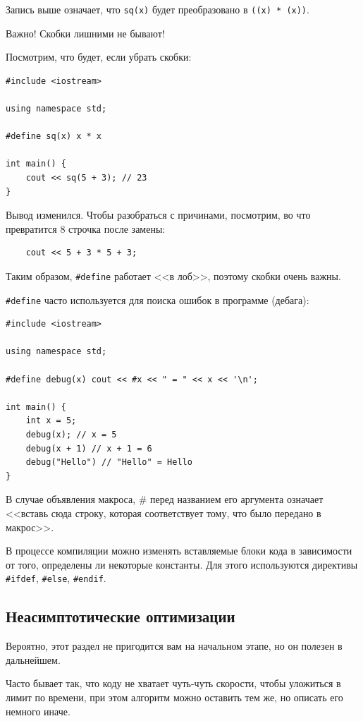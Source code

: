 \documentclass{article}
\newcommand{\important}[1]{
	\begin{sectionenv}[red!30!white]{Важно!}
		#1
	\end{sectionenv}
}
\begin{document}
	Запись выше означает, что \texttt{sq(x)} будет преобразовано в \texttt{((x) * (x))}.

	\important{Скобки лишними не бывают!}

	Посмотрим, что будет, если убрать скобки:

	\begin{lstlisting}
#include <iostream>

using namespace std;

#define sq(x) x * x

int main() {
	cout << sq(5 + 3); // 23
}
	\end{lstlisting}

	Вывод изменился. Чтобы разобраться с причинами, посмотрим, во что превратится 8 строчка после замены:

	\begin{lstlisting}
	cout << 5 + 3 * 5 + 3;
	\end{lstlisting}

	Таким образом, \texttt{\#define} работает <<в лоб>>, поэтому скобки очень важны.

	\texttt{\#define} часто используется для поиска ошибок в программе (дебага):

	\begin{lstlisting}
#include <iostream>

using namespace std;

#define debug(x) cout << #x << " = " << x << '\n';

int main() {
	int x = 5;
	debug(x); // x = 5
	debug(x + 1) // x + 1 = 6
	debug("Hello") // "Hello" = Hello
}
	\end{lstlisting}

	В случае объявления макроса, \# перед названием его аргумента означает <<вставь сюда строку, которая соответствует тому, что было передано в макрос>>.
	
	В процессе компиляции можно изменять вставляемые блоки кода в зависимости от того, определены ли некоторые константы. Для этого используются директивы \texttt{\#ifdef}, \texttt{\#else}, \texttt{\#endif}.
	
	\subsection{Неасимптотические оптимизации}
	
	Вероятно, этот раздел не пригодится вам на начальном этапе, но он полезен в дальнейшем.
	
	Часто бывает так, что коду не хватает чуть-чуть скорости, чтобы уложиться в лимит по времени, при этом алгоритм можно оставить тем же, но описать его немного иначе.
	
\end{document}

